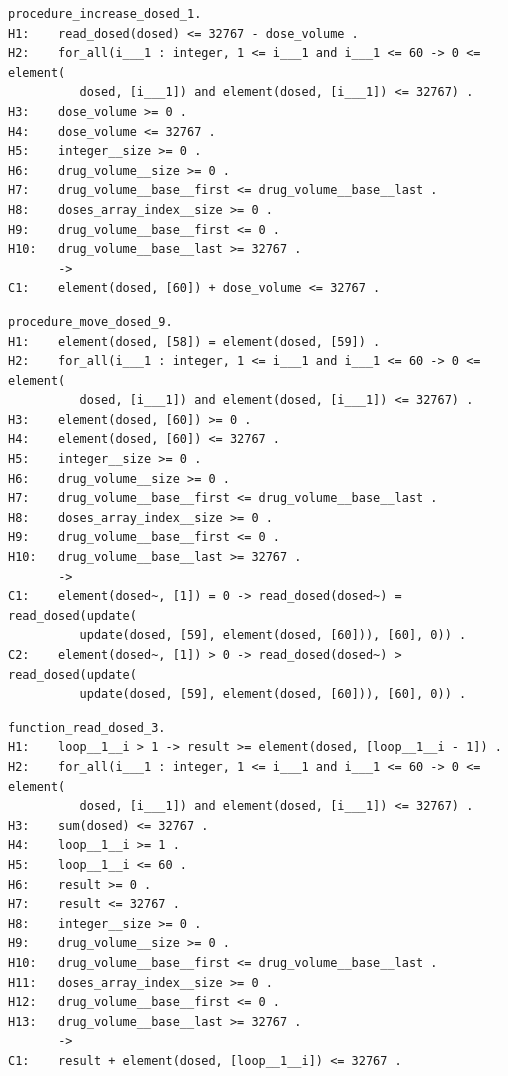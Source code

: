 \singlespacing
\begin{lstlisting}[frame=single, gobble=0, caption={Undischarged Verification Condition from increase\_dosed.siv file}, label={listing:pcapump_undischarged_vc_increase_dosed}]
procedure_increase_dosed_1.
H1:    read_dosed(dosed) <= 32767 - dose_volume .
H2:    for_all(i___1 : integer, 1 <= i___1 and i___1 <= 60 -> 0 <= element(
          dosed, [i___1]) and element(dosed, [i___1]) <= 32767) .
H3:    dose_volume >= 0 .
H4:    dose_volume <= 32767 .
H5:    integer__size >= 0 .
H6:    drug_volume__size >= 0 .
H7:    drug_volume__base__first <= drug_volume__base__last .
H8:    doses_array_index__size >= 0 .
H9:    drug_volume__base__first <= 0 .
H10:   drug_volume__base__last >= 32767 .
       ->
C1:    element(dosed, [60]) + dose_volume <= 32767 .
\end{lstlisting}
\doublespacing

\singlespacing
\begin{lstlisting}[frame=single, gobble=0, caption={Undischarged Verification Condition from move\_dosed.siv file}, label={listing:pcapump_undischarged_vc_move_dosed}]
procedure_move_dosed_9.
H1:    element(dosed, [58]) = element(dosed, [59]) .
H2:    for_all(i___1 : integer, 1 <= i___1 and i___1 <= 60 -> 0 <= element(
          dosed, [i___1]) and element(dosed, [i___1]) <= 32767) .
H3:    element(dosed, [60]) >= 0 .
H4:    element(dosed, [60]) <= 32767 .
H5:    integer__size >= 0 .
H6:    drug_volume__size >= 0 .
H7:    drug_volume__base__first <= drug_volume__base__last .
H8:    doses_array_index__size >= 0 .
H9:    drug_volume__base__first <= 0 .
H10:   drug_volume__base__last >= 32767 .
       ->
C1:    element(dosed~, [1]) = 0 -> read_dosed(dosed~) = read_dosed(update(
          update(dosed, [59], element(dosed, [60])), [60], 0)) .
C2:    element(dosed~, [1]) > 0 -> read_dosed(dosed~) > read_dosed(update(
          update(dosed, [59], element(dosed, [60])), [60], 0)) .
\end{lstlisting}
\doublespacing

\singlespacing
\begin{lstlisting}[frame=single, gobble=0, caption={Undischarged Verification Condition from read\_dosed.siv file}, label={listing:pcapump_undischarged_vc_read_dosed}]
function_read_dosed_3.
H1:    loop__1__i > 1 -> result >= element(dosed, [loop__1__i - 1]) .
H2:    for_all(i___1 : integer, 1 <= i___1 and i___1 <= 60 -> 0 <= element(
          dosed, [i___1]) and element(dosed, [i___1]) <= 32767) .
H3:    sum(dosed) <= 32767 .
H4:    loop__1__i >= 1 .
H5:    loop__1__i <= 60 .
H6:    result >= 0 .
H7:    result <= 32767 .
H8:    integer__size >= 0 .
H9:    drug_volume__size >= 0 .
H10:   drug_volume__base__first <= drug_volume__base__last .
H11:   doses_array_index__size >= 0 .
H12:   drug_volume__base__first <= 0 .
H13:   drug_volume__base__last >= 32767 .
       ->
C1:    result + element(dosed, [loop__1__i]) <= 32767 .
\end{lstlisting}
\doublespacing

